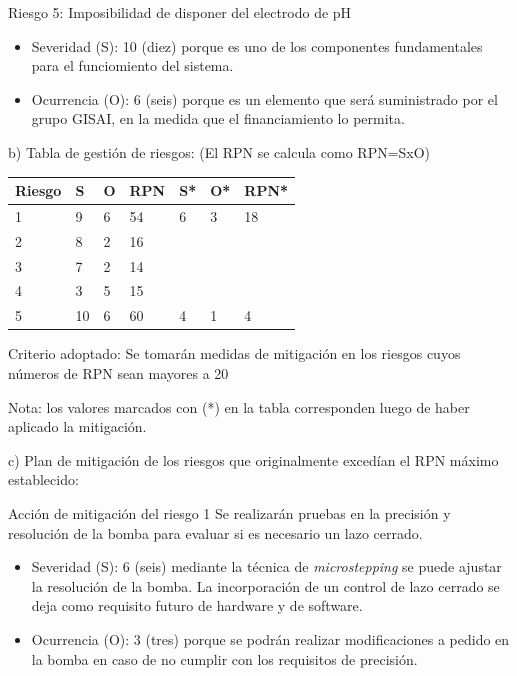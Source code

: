 \documentclass[11pt]{charter}
\begin{document}
Riesgo 5: Imposibilidad de disponer del electrodo de pH
\begin{itemize}
\item Severidad (S): 10 (diez) porque es uno de los componentes fundamentales para el funciomiento del sistema.
\item Ocurrencia (O): 6 (seis) porque es un elemento que será suministrado por el grupo GISAI, en la medida que el financiamiento lo permita.
\end{itemize}


b) Tabla de gestión de riesgos:      (El RPN se calcula como RPN=SxO)

\begin{table}[htpb]
\centering
\begin{tabularx}{\linewidth}{@{}|X|X|X|X|X|X|X|@{}}
\hline
\rowcolor[HTML]{C0C0C0} 
Riesgo & S  & O  & RPN & S* & O* & RPN* \\ \hline
1      & 9  & 6  & 54  & 6  & 3  & 18     \\ \hline
2      & 8  & 2  & 16  &    &    &      \\ \hline
3      & 7  & 2  & 14  &    &    &      \\ \hline
4      & 3  & 5  & 15  &    &    &      \\ \hline
5      & 10 & 6  & 60  & 4  & 1  & 4      \\ \hline
\end{tabularx}%
\end{table}

Criterio adoptado: 
Se tomarán medidas de mitigación en los riesgos cuyos números de RPN sean mayores a 20

Nota: los valores marcados con (*) en la tabla corresponden luego de haber aplicado la mitigación.

c) Plan de mitigación de los riesgos que originalmente excedían el RPN máximo establecido:
 
Acción de mitigación del riesgo 1 Se realizarán pruebas en la precisión y resolución de la bomba para evaluar si es necesario un lazo cerrado.
\begin{itemize}
\item Severidad (S): 6 (seis) mediante la técnica de \textit{microstepping} se puede ajustar la resolución de la bomba. La incorporación de un control de lazo cerrado se deja como requisito futuro de hardware y de software.
\item Ocurrencia (O): 3 (tres) porque se podrán realizar modificaciones a pedido en la bomba en caso de no cumplir con los requisitos de precisión.
\end{itemize} 
\end{document}
